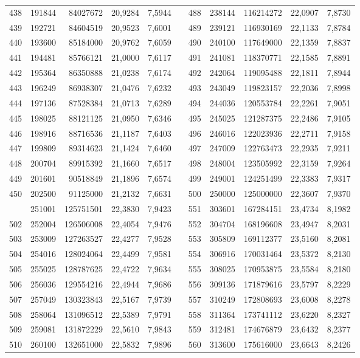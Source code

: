\begin{longtable}{rrrrrrrrrrr}
438&191844&84027672&20,9284&7,5944&&488&238144&116214272&22,0907&7,8730\\
439&192721&84604519&20,9523&7,6001&&489&239121&116930169&22,1133&7,8784\\
440&193600&85184000&20,9762&7,6059&&490&240100&117649000&22,1359&7,8837\\
441&194481&85766121&21,0000&7,6117&&491&241081&118370771&22,1585&7,8891\\
442&195364&86350888&21,0238&7,6174&&492&242064&119095488&22,1811&7,8944\\
443&196249&86938307&21,0476&7,6232&&493&243049&119823157&22,2036&7,8998\\
444&197136&87528384&21,0713&7,6289&&494&244036&120553784&22,2261&7,9051\\
445&198025&88121125&21,0950&7,6346&&495&245025&121287375&22,2486&7,9105\\
446&198916&88716536&21,1187&7,6403&&496&246016&122023936&22,2711&7,9158\\
447&199809&89314623&21,1424&7,6460&&497&247009&122763473&22,2935&7,9211\\
448&200704&89915392&21,1660&7,6517&&498&248004&123505992&22,3159&7,9264\\
449&201601&90518849&21,1896&7,6574&&499&249001&124251499&22,3383&7,9317\\
450&202500&91125000&21,2132&7,6631&&500&250000&125000000&22,3607&7,9370\\
\newpage
501&251001&125751501&22,3830&7,9423&&551&303601&167284151&23,4734&8,1982\\
502&252004&126506008&22,4054&7,9476&&552&304704&168196608&23,4947&8,2031\\
503&253009&127263527&22,4277&7,9528&&553&305809&169112377&23,5160&8,2081\\
504&254016&128024064&22,4499&7,9581&&554&306916&170031464&23,5372&8,2130\\
505&255025&128787625&22,4722&7,9634&&555&308025&170953875&23,5584&8,2180\\
506&256036&129554216&22,4944&7,9686&&556&309136&171879616&23,5797&8,2229\\
507&257049&130323843&22,5167&7,9739&&557&310249&172808693&23,6008&8,2278\\
508&258064&131096512&22,5389&7,9791&&558&311364&173741112&23,6220&8,2327\\
509&259081&131872229&22,5610&7,9843&&559&312481&174676879&23,6432&8,2377\\
510&260100&132651000&22,5832&7,9896&&560&313600&175616000&23,6643&8,2426\\

\end{longtable}
